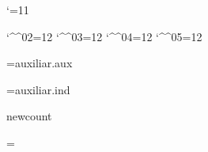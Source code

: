 
\catcode`\@=11

\catcode`\^^02=12 \catcode`\^^03=12 \catcode`\^^04=12 \catcode`\^^05=12


\newread\infile

\newif\ifauxf
\openin\infile=auxiliar.aux
\ifeof\infile \auxffalse \else \auxftrue \fi
\closein\infile

\newif\ifindf
\openin\infile=auxiliar.ind
\ifeof\infile \indffalse \else \indftrue \fi
\closein\infile


\ifx\pdfoutput\undefined \csname newcount\endcsname\pdfoutput \fi


\def\cmykWhite{0 0 0 0} \def\cmykDarkWhite{0 0 0 .3}
\def\cmykGray{0 0 0 .5} \def\cmykDarkGray{0 0 0 .7}
\def\cmykBlack{0 0 0 1} \let\cmykDarkBlack=\cmykBlack
\def\cmykYellow{0 0 1 0} \def\cmykDarkYellow{0 0 1 .7}
\def\cmykMagenta{0 1 0 0} \def\cmykDarkMagenta{0 1 0 .7}
\def\cmykCyan{1 0 0 0} \def\cmykDarkCyan{1 0 0 .7}
\def\cmykRed{0 1 1 0} \def\cmykDarkRed{0 1 1 .7}
\def\cmykGreen{1 0 1 0} \def\cmykDarkGreen{1 0 1 .7}
\def\cmykBlue{1 1 0 0} \def\cmykDarkBlue{1 1 0 .7}

\newcount\col@rstack
\def\pdf@color#1{\pdfcolorstack\col@rstack push {\csname cmyk#1\endcsname k}}
 \def\pdf@darkcolor#1{\pdfcolorstack\col@rstack push {\csname cmykDark#1\endcsname k}}
 \def\pdf@endcolor{\pdfcolorstack\col@rstack pop}
\def\dvips@color#1{\special{color push cmyk \csname cmyk#1\endcsname}}
 \def\dvips@darkcolor#1{\special{color push cmyk \csname cmykDark#1\endcsname}}
 \def\dvips@endcolor{\special{color pop}}
\def\dvipdf@color#1{\special{pdf: bc [\csname cmyk#1\endcsname]}}
 \def\dvipdf@darkcolor#1{\special{pdf: bc [\csname cmykDark#1\endcsname]}}
 \def\dvipdf@endcolor{\special{pdf: ec}}

\ifcase\pdfoutput
 \ifx\dvips\undefined
  \def\colors{\let\color=\dvipdf@color\let\endcolor=\dvipdf@endcolor}
  \def\darkcolors{\let\color=\dvipdf@darkcolor\let\endcolor=\dvipdf@endcolor}
 \else
  \def\colors{\let\color=\dvips@color\let\endcolor=\dvips@endcolor}
  \def\darkcolors{\let\color=\dvips@darkcolor\let\endcolor=\dvips@endcolor}
 \fi
\else
 \col@rstack=
 \def\colors{\let\color=\pdf@color\let\endcolor=\pdf@endcolor}
 \def\darkcolors{\let\color=\pdf@darkcolor\let\endcolor=\pdf@endcolor}
\fi

